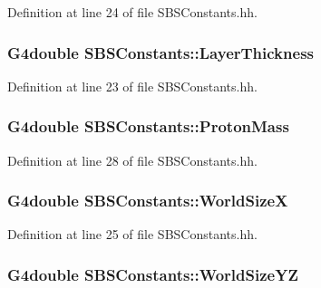 Definition at line 24 of file S\-B\-S\-Constants.\-hh.

\hypertarget{class_s_b_s_constants_a29bf41467669a48826fb1bca3011820f}{
\subsubsection[{Layer\-Thickness}]{\setlength{\rightskip}{0pt plus 5cm}G4double S\-B\-S\-Constants\-::\-Layer\-Thickness}}\label{class_s_b_s_constants_a29bf41467669a48826fb1bca3011820f}


Definition at line 23 of file S\-B\-S\-Constants.\-hh.

\hypertarget{class_s_b_s_constants_a88d873c312dc69a76d5e8b2c0f08ec25}{
\subsubsection[{Proton\-Mass}]{\setlength{\rightskip}{0pt plus 5cm}G4double S\-B\-S\-Constants\-::\-Proton\-Mass}}\label{class_s_b_s_constants_a88d873c312dc69a76d5e8b2c0f08ec25}


Definition at line 28 of file S\-B\-S\-Constants.\-hh.

\hypertarget{class_s_b_s_constants_a9b72c9889cfe808ce1d54dae2968f776}{
\subsubsection[{World\-Size\-X}]{\setlength{\rightskip}{0pt plus 5cm}G4double S\-B\-S\-Constants\-::\-World\-Size\-X}}\label{class_s_b_s_constants_a9b72c9889cfe808ce1d54dae2968f776}


Definition at line 25 of file S\-B\-S\-Constants.\-hh.

\hypertarget{class_s_b_s_constants_a8a08daf887918c2a3420c46b8adb17f0}{
\subsubsection[{World\-Size\-Y\-Z}]{\setlength{\rightskip}{0pt plus 5cm}G4double S\-B\-S\-Constants\-::\-World\-Size\-Y\-Z}}\label{class_s_b_s_constants_a8a08daf887918c2a3420c46b8adb17f0}


